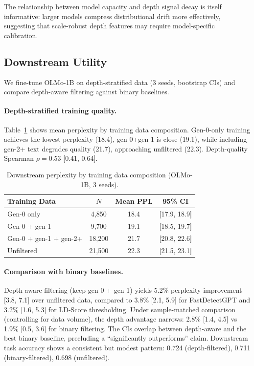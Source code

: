 \documentclass[letterpaper]{article}
\begin{document}
The relationship between model capacity and depth signal decay is itself informative: larger models compress distributional drift more effectively, suggesting that scale-robust depth features may require model-specific calibration.

\subsection{Downstream Utility}
\label{sec:downstream}

We fine-tune OLMo-1B on depth-stratified data (3 seeds, bootstrap CIs) and compare depth-aware filtering against binary baselines.

\paragraph{Depth-stratified training quality.}
Table~\ref{tab:downstream} shows mean perplexity by training data composition.
Gen-0-only training achieves the lowest perplexity (18.4), gen-0+gen-1 is close (19.1), while including gen-2+ text degrades quality (21.7), approaching unfiltered (22.3).
Depth-quality Spearman $\rho{=}0.53$ [0.41, 0.64].

\begin{table}[h]
\centering
\caption{Downstream perplexity by training data composition (OLMo-1B, 3 seeds).}
\label{tab:downstream}
\begin{tabular}{lccc}
\toprule
Training Data & $N$ & Mean PPL & 95\% CI \\
\midrule
Gen-0 only & 4{,}850 & 18.4 & [17.9, 18.9] \\
Gen-0 + gen-1 & 9{,}700 & 19.1 & [18.5, 19.7] \\
Gen-0 + gen-1 + gen-2+ & 18{,}200 & 21.7 & [20.8, 22.6] \\
Unfiltered & 21{,}500 & 22.3 & [21.5, 23.1] \\
\bottomrule
\end{tabular}
\end{table}

\paragraph{Comparison with binary baselines.}
Depth-aware filtering (keep gen-0 + gen-1) yields 5.2\% perplexity improvement [3.8, 7.1] over unfiltered data, compared to 3.8\% [2.1, 5.9] for FastDetectGPT and 3.2\% [1.6, 5.3] for LD-Score thresholding.
Under sample-matched comparison (controlling for data volume), the depth advantage narrows: 2.8\% [1.4, 4.5] vs 1.9\% [0.5, 3.6] for binary filtering.
The CIs overlap between depth-aware and the best binary baseline, precluding a ``significantly outperforms'' claim.
Downstream task accuracy shows a consistent but modest pattern: 0.724 (depth-filtered), 0.711 (binary-filtered), 0.698 (unfiltered).
\end{document}
